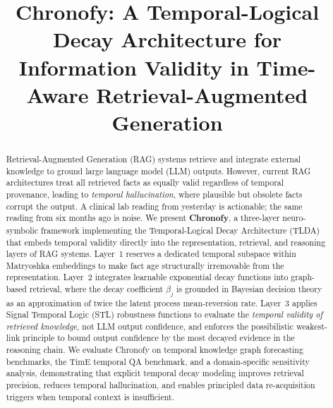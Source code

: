 \documentclass[conference]{IEEEtran}
\newif\ifcameraready
\begin{document}
\title{Chronofy: A Temporal-Logical Decay Architecture for\\Information Validity in Time-Aware Retrieval-Augmented Generation}

\ifcameraready
\hypersetup{pdfauthor={Muntaser Syed, Marius Silaghi, Sheikh Abujar, Sharun Akter}}
\author{
\IEEEauthorblockN{Muntaser Syed\IEEEauthorrefmark{1}, Marius Silaghi\IEEEauthorrefmark{1}, Sheikh Abujar\IEEEauthorrefmark{2}, Sharun Akter\IEEEauthorrefmark{3}}
\IEEEauthorblockA{\IEEEauthorrefmark{1}Florida Institute of Technology, Melbourne, FL, USA \\ msyed2011@my.fit.edu, msilaghi@fit.edu}
\IEEEauthorblockA{\IEEEauthorrefmark{2}University of Alabama at Birmingham, Birmingham, AL, USA \\ sabujar@uab.edu}
\IEEEauthorblockA{\IEEEauthorrefmark{3}Daffodil International University, Dhaka, Bangladesh \\ sharun.cse@diu.edu.bd}
}
\else
{}
\author{}
\fi

\maketitle

\begin{abstract}
Retrieval-Augmented Generation (RAG) systems retrieve and integrate external knowledge to ground large language model (LLM) outputs. However, current RAG architectures treat all retrieved facts as equally valid regardless of temporal provenance, leading to \emph{temporal hallucination}, where plausible but obsolete facts corrupt the output. A clinical lab reading from yesterday is actionable; the same reading from six months ago is noise. We present \textbf{Chronofy}, a three-layer neuro-symbolic framework implementing the Temporal-Logical Decay Architecture (TLDA) that embeds temporal validity directly into the representation, retrieval, and reasoning layers of RAG systems. Layer~1 reserves a dedicated temporal subspace within Matryoshka embeddings to make fact age structurally irremovable from the representation. Layer~2 integrates learnable exponential decay functions into graph-based retrieval, where the decay coefficient $\beta_j$ is grounded in Bayesian decision theory as an approximation of twice the latent process mean-reversion rate. Layer~3 applies Signal Temporal Logic (STL) robustness functions to evaluate the \emph{temporal validity of retrieved knowledge}, not LLM output confidence, and enforces the possibilistic weakest-link principle to bound output confidence by the most decayed evidence in the reasoning chain. We evaluate Chronofy on temporal knowledge graph forecasting benchmarks, the TimE temporal QA benchmark, and a domain-specific sensitivity analysis, demonstrating that explicit temporal decay modeling improves retrieval precision, reduces temporal hallucination, and enables principled data re-acquisition triggers when temporal context is insufficient.
\end{abstract}
\end{document}
